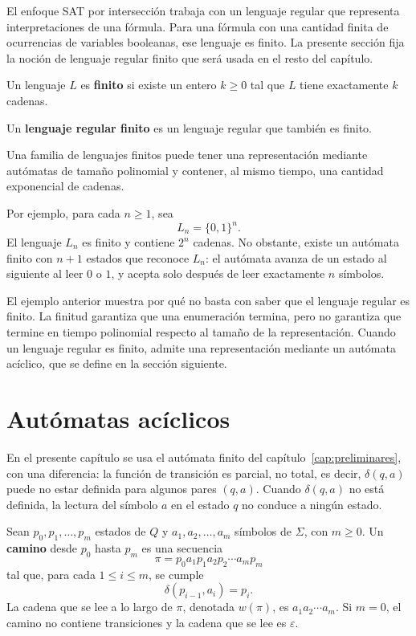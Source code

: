 El enfoque SAT por intersección trabaja con un lenguaje regular que
representa interpretaciones de una fórmula. Para una fórmula con una
cantidad finita de ocurrencias de variables booleanas, ese lenguaje es finito. La presente
sección fija la noción de lenguaje regular finito que será usada en el
resto del capítulo.

\begin{definicion}
Un lenguaje $L$ es \textbf{finito} si existe un entero $k \ge 0$ tal
que $L$ tiene exactamente $k$ cadenas.
\end{definicion}

\begin{definicion}
Un \textbf{lenguaje regular finito} es un lenguaje regular que también
es finito.
\end{definicion}

Una familia de lenguajes finitos puede tener
una representación mediante autómatas de tamaño polinomial y contener,
al mismo tiempo, una cantidad exponencial de cadenas.

Por ejemplo, para cada $n \ge 1$, sea
\[
  L_n = \{0,1\}^n.
\]
El lenguaje $L_n$ es finito y contiene $2^n$ cadenas. No obstante,
existe un autómata finito con $n+1$ estados que reconoce
$L_n$: el autómata avanza de un estado al siguiente al leer $0$ o $1$, y
acepta solo después de leer exactamente $n$ símbolos.

El ejemplo anterior muestra por qué no basta con saber que el lenguaje
regular es finito. La finitud garantiza que una enumeración termina, pero
no garantiza que termine en tiempo polinomial respecto al tamaño de la
representación. Cuando un lenguaje regular es finito, admite una
representación mediante un autómata acíclico, que se define en la
sección siguiente.

\section{Autómatas acíclicos}
\label{sec:automatas-aciclicos}

En el presente capítulo se usa el autómata finito del
capítulo~\ref{cap:preliminares}, con una diferencia: la función de
transición es parcial, no total, es decir, $\delta(q,a)$ puede no estar
definida para algunos pares $(q,a)$. Cuando $\delta(q,a)$ no está
definida, la lectura del símbolo $a$ en el estado $q$ no conduce a
ningún estado.

\begin{definicion}
Sean $p_0,p_1,\ldots,p_m$ estados de $Q$ y $a_1,a_2,\ldots,a_m$
símbolos de $\Sigma$, con $m \ge 0$. Un \textbf{camino} desde $p_0$
hasta $p_m$ es una secuencia
\[
  \pi = p_0 a_1 p_1 a_2 p_2 \cdots a_m p_m
\]
tal que, para cada $1 \le i \le m$, se cumple
\[
  \delta(p_{i-1},a_i)=p_i.
\]
La cadena que se lee a lo largo de $\pi$, denotada $w(\pi)$, es
$a_1a_2\cdots a_m$. Si $m=0$, el camino no contiene transiciones y la
cadena que se lee es $\varepsilon$.
\end{definicion}

